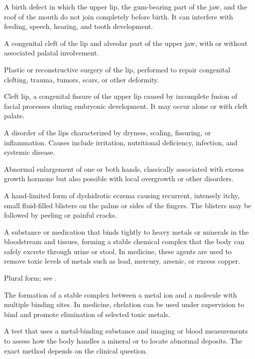  A birth defect in which the upper lip, the gum-bearing part of the jaw, and the roof of the mouth do not join completely before birth. It can interfere with feeding, speech, hearing, and tooth development.

 A congenital cleft of the lip and alveolar part of the upper jaw, with or without associated palatal involvement.

 Plastic or reconstructive surgery of the lip, performed to repair congenital clefting,
trauma, tumors, scars, or other deformity.

 Cleft lip, a congenital fissure of the upper lip caused by incomplete fusion of facial
processes during embryonic development. It may occur alone or with cleft palate.

 A disorder of the lips characterized by dryness, scaling, fissuring, or inflammation.
Causes include irritation, nutritional deficiency, infection, and systemic disease.

 Abnormal enlargement of one or both hands, classically associated with excess growth hormone but also possible with local overgrowth or other disorders.

 A hand-limited form of dyshidrotic eczema causing recurrent, intensely itchy,
small fluid-filled blisters on the palms or sides of the fingers. The blisters may be
followed by peeling or painful cracks.

 A substance or medication that binds tightly to heavy metals or minerals in the bloodstream and tissues, forming a stable chemical complex that the body can safely excrete through urine or stool. In medicine, these agents are used to remove toxic levels of metals such as lead, mercury, arsenic, or excess copper.

 Plural form; see .

 The formation of a stable complex between a metal ion and a molecule with multiple
binding sites. In medicine, chelation can be used under supervision to bind and promote
elimination of selected toxic metals.

 A test that uses a metal-binding substance and imaging or blood measurements to assess how the body handles a mineral or to locate abnormal deposits. The exact method depends on the clinical question.

